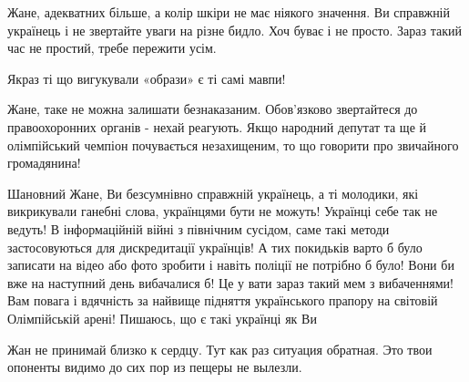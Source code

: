 \begin{itemize}
Жане, адекватних більше, а колір шкіри не має ніякого значення. Ви справжній
українець і не звертайте уваги на різне бидло. Хоч буває і не просто. Зараз такий
час не простий, требе пережити усім.

 
Якраз ті що вигукували «образи» є ті самі мавпи!

 

Жане, таке не можна залишати безнаказаним. Обов'язково звертайтеся до
правоохоронних органів - нехай реагують. Якщо народний депутат та ще й
олімпійський чемпіон почувається незахищеним, то що говорити про звичайного
громадянина!


 

Шановний Жане, Ви безсумнівно справжній українець, а ті молодики, які
викрикували ганебні слова, українцями бути не можуть! Українці себе так не
ведуть! В інформаційній війні з північним сусідом, саме такі методи
застосовуються для дискредитації українців! А тих покидьків варто б було
записати на відео або фото зробити і навіть поліції не потрібно б було! Вони би
вже на наступний день вибачалися б! Це у вати зараз такий мем з вибаченнями!
Вам повага і вдячність за найвище підняття українського прапору на світовій
Олімпійській арені! Пишаюсь, що є такі українці як Ви 💪🇺🇦

 
Жан не принимай близко к сердцу. Тут как раз ситуация обратная. Это твои опоненты видимо до сих пор из пещеры не вылезли.

 


\end{itemize}

